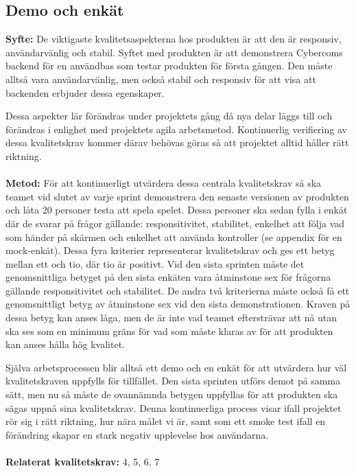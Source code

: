 \documentclass[10pt]{article}
\begin{document}
	\subsection{Demo och enkät}
	\textbf{Syfte:} De viktigaste kvalitetsaspekterna hos produkten är att den är responsiv, användarvänlig och stabil. Syftet med produkten är att demonstrera Cybercoms backend för en användbas som testar produkten för första gången. Den måste alltså vara användarvänlig, men också stabil och responsiv för att visa att backenden erbjuder dessa egenskaper.
	
	Dessa aspekter lär förändras under projektets gång då nya delar läggs till och förändras i enlighet med projektets agila arbetsmetod. Kontinuerlig verifiering av dessa kvalitetskrav kommer därav behövas göras så att projektet alltid håller rätt riktning.
	\\\\
	\textbf{Metod:} För att kontinuerligt utvärdera dessa centrala kvalitetskrav så ska teamet vid slutet av varje sprint demonstrera den senaste versionen av produkten och låta 20 personer testa att spela spelet. Dessa personer ska sedan fylla i enkät där de svarar på frågor gällande: responsitivitet, stabilitet, enkelhet att följa vad som händer på skärmen och enkelhet att använda kontroller (se appendix för en mock-enkät). Dessa fyra kriterier representerar kvalitetskrav och ges ett betyg mellan ett och tio, där tio är positivt. Vid den sista sprinten måste det genomsnittliga betyget på den sista enkäten vara åtminstone sex för frågorna gällande responsitivitet och stabilitet. De andra två kriterierna måste också få ett genomsnittligt betyg av åtminstone sex vid den sista demonstrationen. Kraven på dessa betyg kan anses låga, men de är inte vad teamet eftersträvar att nå utan ska ses som en minimum gräns för vad som måste klaras av för att produkten kan anses hålla hög kvalitet.
	
	Själva arbetsprocessen blir alltså ett demo och en enkät för att utvärdera hur väl kvalitetskraven uppfylls för tillfället. Den sista sprinten utförs demot på samma sätt, men nu så måste de ovannämnda betygen uppfyllas för att produkten ska sägas uppnå sina kvalitetskrav. Denna kontinuerliga process visar ifall projektet rör sig i rätt riktning, hur nära målet vi är, samt som ett smoke test ifall en förändring skapar en stark negativ upplevelse hos användarna.
	\\\\
	\textbf{Relaterat kvalitetskrav:} 4, 5, 6, 7
	\\
	
\end{document}
